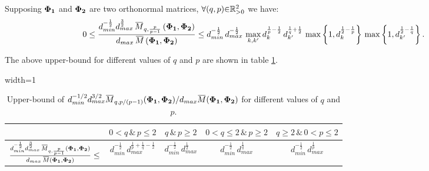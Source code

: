 \begin{property}
\label{prp:DontKnow2} 
Supposing $\boldsymbol{\Phi}_{\boldsymbol{1}}$ and $\boldsymbol{\Phi}_{\boldsymbol{2}}$ are two orthonormal matrices, $\forall (q , p) {\in} \mathbb{R}^2_{{>} 0}$ we have:
\begin{gather*}
\begin{aligned}
0 \leq 
\frac{d_{min}^{-\frac12} d_{max}^{\frac32} \, \overbar{M}_{q,\frac{p}{p-1}}\myparanthese{\myPhiOne , \myPhiTwo}}{d_{max} \, \overbar{M}\myparanthese{\myPhiOne , \myPhiTwo}} \leq 
d_{min}^{-\frac12} \, d_{max}^{-\frac12} \, \max_{k,k'} d_{k}^{\frac1p - \frac12} \, d_{k'}^{\frac1q + \frac12} \, &\max \mybrace{1 , d_k^{\frac12 - \frac1p}} \, \max \mybrace{1 , d_{k'}^{\frac12 - \frac1q}}.
\end{aligned}
\end{gather*}
\iffalse
\begin{equation*}
\overbar{M}_{q,\frac{p}{p-1}}\myparanthese{\myPhiOne , \myPhiTwo} \leq 
\begin{cases}
d_{max}^{\frac1p + \frac12} \, \overbar{M}\myparanthese{\myPhiOne , \myPhiTwo}, & \qquad \text{for \ }q \geq 1\\
d_{max}^{\frac1p + \frac1q - \frac12} \, \overbar{M}\myparanthese{\myPhiOne , \myPhiTwo}, & \qquad \text{for \ }q < 1\\
\end{cases}.
\end{equation*}
\fi
The above upper-bound for different values of $q$ and $p$ are shown in table \ref{table:BasicBMCC-BasicMCC}.
\begin{table*}[bp]
\begin{adjustbox}{width=1\textwidth} %
\centering
\begin{tabular}{ccccc}
\toprule
\multicolumn{1}{c}{} &\multicolumn{1}{c}{${0 < q\, \& \, p \leq 2}$} & \multicolumn{1}{c}{${q\, \& \, p \geq 2}$}  & \multicolumn{1}{c}{${0 < q \leq 2\, \& \, p \geq 2}$} & \multicolumn{1}{c}{${q \geq 2\, \& \, 0 < p \leq 2}$} \\ \midrule %
\multicolumn{1}{r}{${\frac{d_{min}^{-\frac12} d_{max}^{\frac32} \, \overbar{M}_{q,\frac{p}{p-1}}\myparanthese{\myPhiOne , \myPhiTwo}}{d_{max} \, \overbar{M}\myparanthese{\myPhiOne , \myPhiTwo}} \leq}$} &\multicolumn{1}{c}{$d_{min}^{-\frac12} \, d_{max}^{\frac1p + \frac1q - \frac12}$} & \multicolumn{1}{c}{$d_{min}^{-\frac12} \, d_{max}^{\frac12}$} & \multicolumn{1}{c}{$d_{min}^{-\frac12} \, d_{max}^{\frac1q}$} &\multicolumn{1}{c}{$d_{min}^{-\frac12} \, d_{max}^{\frac1p}$}    \\ 
\bottomrule %
\end{tabular}
\end{adjustbox}
\caption{Upper-bound of $d_{min}^{-1/2} d_{max}^{3/2} \overbar{M}_{q,p/(p-1)} (\myPhiOne , \myPhiTwo) / d_{max} \overbar{M}(\myPhiOne,\myPhiTwo)$ for different values of $q$ and $p$.}
\label{table:BasicBMCC-BasicMCC}
\end{table*}
\end{property}
